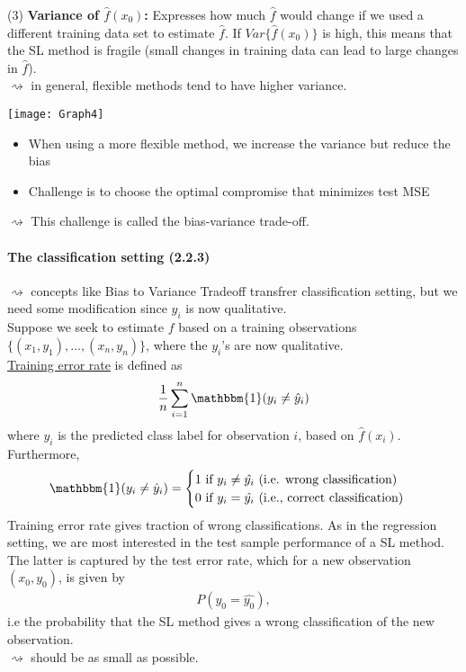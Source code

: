 \documentclass[11pt,a4paper,numbers=endperiod]{scrartcl}
\begin{document}
(3) \textbf{Variance of $\hat{f}(x_0)$:} Expresses how much $\hat{f}$ would change if we used a different training data set to estimate $\hat{f}$. If $Var \{\hat{f}(x_0)\}$ is high, this means that the SL method is fragile (small changes in training data can lead to large changes in $\hat{f}$).\\
$\rightsquigarrow$ in general, flexible methods tend to have higher variance. \\
\begin{center}
	\texttt{[image: Graph4]}
\end{center}

\begin{itemize}[label={--}]
	\item When using a more flexible method, we increase the variance but reduce the bias
	\item Challenge is to choose the optimal compromise that minimizes test MSE
\end{itemize}
$\rightsquigarrow$ This challenge is called the bias-variance trade-off. 
\newpage
\paragraph{The classification setting (2.2.3)}
$ $\\

$\rightsquigarrow$ concepts like Bias to Variance Tradeoff transfrer classification setting, but we need some modification since $y_i$ is now qualitative.\\

Suppose we seek to estimate $f$ based on a training observations $\{(x_1, y_1), \ldots, (x_n, y_n)\}$, where the $y_i$'s are now qualitative.\\
\underline{Training error rate} is defined as 
\begin{align*}
	\frac{1}{n} \sum\limits_{i =1}^n \mathbbm{1}(y_i \neq \hat{y}_i)
\end{align*}
where $\hat{y_i}$ is the predicted class label for observation $i$, based on $\hat{f}(x_i)$. Furthermore, 
\begin{align*}
	\mathbbm{1}(y_i \neq \hat{y}_i) = \begin{cases}
		1 \text{ if } y_i \neq \hat{y_i} \text{  (i.e. wrong classification)}\\
		0 \text{ if } y_i = \hat{y_i} \text{ (i.e., correct classification)}
		\end{cases}
\end{align*}
Training error rate gives traction of wrong classifications. As in the regression setting, we are most interested in the test sample performance of a SL method. The latter is captured by the test error rate, which for a new observation $(x_0, y_0)$, is given by
\begin{align*}
	P(y_0 = \hat{y_0}), 
\end{align*}
i.e the probability that the SL method gives a wrong classification of the new observation.\\ $\rightsquigarrow$ should be as small as possible. 
\newpage
\end{document}
